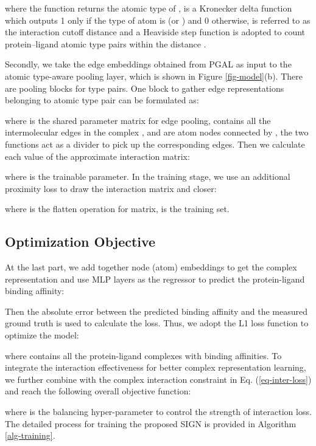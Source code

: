 \documentclass[sigconf]{acmart}
\newcommand{\model}{\textsf{SIGN}\xspace}
\newcommand{\gnn}{PGAL\xspace}
\begin{document}
where the function  returns the atomic type of ,  is a Kronecker delta function which outputs 1 only if the type of atom is  (or ) and 0 otherwise,  is referred to as the interaction cutoff distance and a Heaviside step function  is adopted to count protein–ligand atomic type pairs within the distance . 

Secondly, we take the edge embeddings obtained from \gnn as input to the atomic type-aware pooling layer, which is shown in Figure \ref{fig-model}(b). There are  pooling blocks for type pairs. One block to gather edge representations belonging to atomic type pair  can be formulated as:

where  is the shared parameter matrix for edge pooling,  contains all the intermolecular edges in the complex ,  and  are atom nodes connected by , the two  functions act as a divider to pick up the corresponding edges. Then we calculate each value of the approximate interaction matrix:

where  is the trainable parameter. In the training stage, we use an additional proximity loss to draw the interaction matrix  and  closer:

where  is the flatten operation for matrix,  is the training set.





\subsection{Optimization Objective}
At the last part, we add together node (atom) embeddings to get the complex representation and use MLP layers as the regressor to predict the protein-ligand binding affinity:


Then the absolute error between the predicted binding affinity  and the measured ground truth  is used to calculate the loss. Thus, we adopt the L1 loss function to optimize the model: 

where  contains all the protein-ligand complexes with binding affinities. To integrate the interaction effectiveness for better complex representation learning, we further combine with the complex interaction constraint in Eq. (\ref{eq-inter-loss}) and reach the following overall objective function:

where  is the balancing hyper-parameter to control the strength of interaction loss. The detailed process for training the proposed \model is provided in Algorithm \ref{alg-training}.
\end{document}
